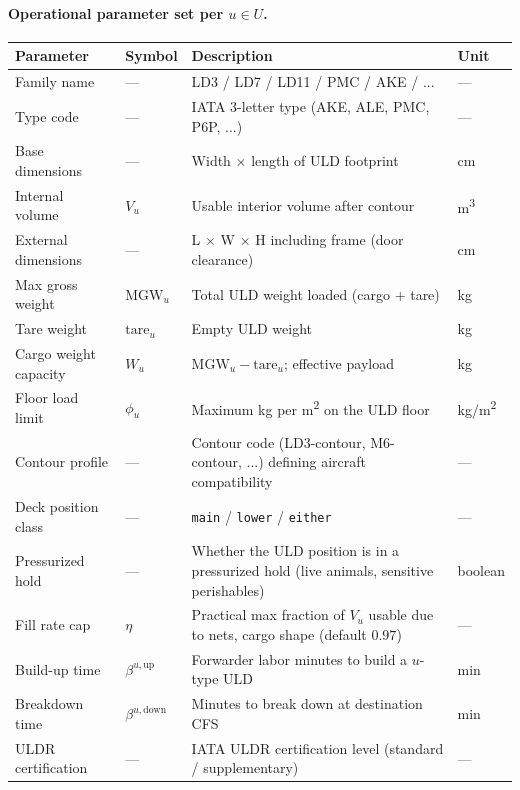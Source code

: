 \documentclass[11pt,a4paper]{article}
\theoremstyle{definition}
\begin{document}
\paragraph{Operational parameter set per $u \in U$.}
\begin{center}
\begin{tabular}{llp{7cm}l}
\toprule
Parameter & Symbol & Description & Unit \\
\midrule
Family name & --- & LD3 / LD7 / LD11 / PMC / AKE / ... & --- \\
Type code & --- & IATA 3-letter type (AKE, ALE, PMC, P6P, ...) & --- \\
Base dimensions & --- & Width $\times$ length of ULD footprint & cm \\
Internal volume & $V_u$ & Usable interior volume after contour & m\textsuperscript{3} \\
External dimensions & --- & L $\times$ W $\times$ H including frame (door clearance) & cm \\
Max gross weight & $\text{MGW}_u$ & Total ULD weight loaded (cargo + tare) & kg \\
Tare weight & $\text{tare}_u$ & Empty ULD weight & kg \\
Cargo weight capacity & $W_u$ & $\text{MGW}_u - \text{tare}_u$; effective payload & kg \\
Floor load limit & $\phi_u$ & Maximum kg per m\textsuperscript{2} on the ULD floor & kg/m\textsuperscript{2} \\
Contour profile & --- & Contour code (LD3-contour, M6-contour, ...) defining aircraft compatibility & --- \\
Deck position class & --- & \texttt{main} / \texttt{lower} / \texttt{either} & --- \\
Pressurized hold & --- & Whether the ULD position is in a pressurized hold (live animals, sensitive perishables) & boolean \\
Fill rate cap & $\eta$ & Practical max fraction of $V_u$ usable due to nets, cargo shape (default $0.97$) & --- \\
Build-up time & $\beta^{u,\text{up}}$ & Forwarder labor minutes to build a $u$-type ULD & min \\
Breakdown time & $\beta^{u,\text{down}}$ & Minutes to break down at destination CFS & min \\
ULDR certification & --- & IATA ULDR certification level (standard / supplementary) & --- \\
\bottomrule
\end{tabular}
\end{center}
\end{document}
